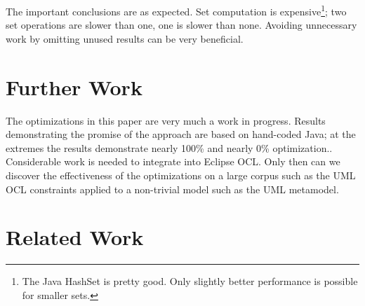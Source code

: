 \documentclass[
]{ceurart}
\begin{document}
The important conclusions are as expected. Set computation is expensive\footnote{The Java HashSet is pretty good. Only slightly better performance is possible for smaller sets.}; two set operations are slower than one, one is slower than none. Avoiding unnecessary work by omitting unused results can be very beneficial.


\section{Further Work}\label{Further Work}

The optimizations in this paper are very much a work in progress. Results demonstrating the promise of the approach are based on hand-coded Java; at the extremes the results demonstrate nearly 100\% and nearly 0\% optimization.. Considerable work is needed to integrate into Eclipse OCL. Only then can we discover the effectiveness of the optimizations on a large corpus such as the UML OCL constraints applied to a non-trivial model such as the UML metamodel.

\section{Related Work}\label{Related Work}
\end{document}
